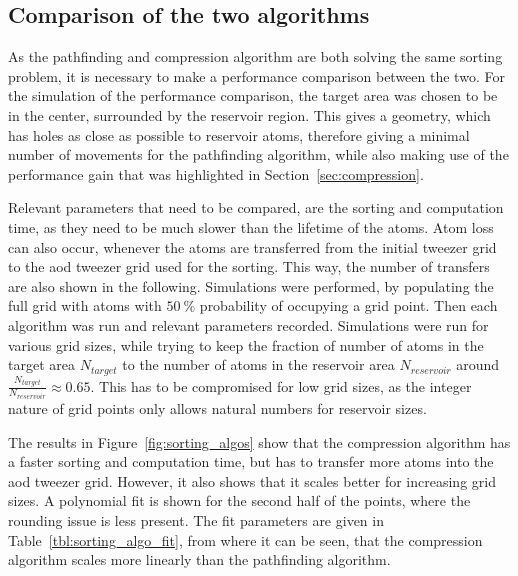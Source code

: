 \subsection{Comparison of the two algorithms}

As the pathfinding and compression algorithm are both solving the same sorting problem, it is necessary to make a performance comparison between the two. For the simulation of the performance comparison, the target area was chosen to be in the center, surrounded by the reservoir region. This gives a geometry, which has holes as close as possible to reservoir atoms, therefore giving a minimal number of movements for the pathfinding algorithm, while also making use of the performance gain that was highlighted in Section~\ref{sec:compression}.

Relevant parameters that need to be compared, are the sorting and computation time, as they need to be much slower than the lifetime of the atoms. Atom loss can also occur, whenever the atoms are transferred from the initial tweezer grid to the \ac{aod} tweezer grid used for the sorting. This way, the number of transfers are also shown in the following.
Simulations were performed, by populating the full grid with atoms with $\SI{50}{\percent}$ probability of occupying a grid point. Then each algorithm was run and relevant parameters recorded. Simulations were run for various grid sizes, while trying to keep the fraction of number of atoms in the target area $N_{target}$ to the number of atoms in the reservoir area $N_{reservoir}$ around $\frac{N_{target}}{N_{reservoir}} \approx 0.65$. This has to be compromised for low grid sizes, as the integer nature of grid points only allows natural numbers for reservoir sizes.

The results in Figure~\ref{fig:sorting_algos} show that the compression algorithm has a faster sorting and computation time, but has to transfer more atoms into the \ac{aod} tweezer grid. However, it also shows that it scales better for increasing grid sizes. A polynomial fit is shown for the second half of the points, where the rounding issue is less present. The fit parameters are given in Table~\ref{tbl:sorting_algo_fit}, from where it can be seen, that the compression algorithm scales more linearly than the pathfinding algorithm.

